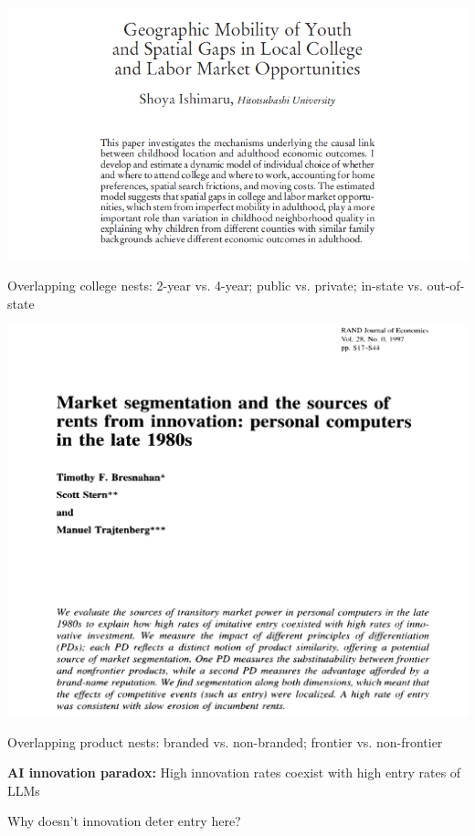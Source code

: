 \documentclass[aspectratio=169]{beamer}
\begin{document}
\begin{frame}
\begin{center}
\includegraphics[width=.6\textwidth]{Ishimaru_cover.jpg}    
\end{center}
\bigskip{}


Overlapping college nests: 2-year vs. 4-year; public vs. private; in-state vs. out-of-state
\end{frame}




\begin{frame}
\begin{center}
\includegraphics[width=.6\textwidth]{BST_cover.jpg}
\end{center}
\bigskip{}


Overlapping product nests: branded vs. non-branded; frontier vs. non-frontier
\end{frame}






\begin{frame}
\textbf{AI innovation paradox:} High innovation rates coexist with high entry rates of LLMs
\bigskip{}


Why doesn't innovation deter entry here?
\bigskip{}




\end{frame}
\end{document}

